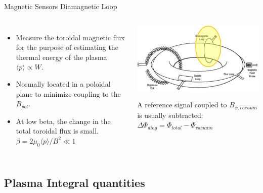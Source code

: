 \documentclass{beamer}
\begin{document}
\begin{frame}{Magnetic Sensors } {Diamagnetic Loop}
\begin{columns}
     \begin{itemize}
	 \item Measure the toroidal magnetic flux for the purpose of estimating the thermal energy of the plasma $\langle p \rangle  \propto W$. 
	 \item Normally located in a poloidal plane  to minimize coupling to the $B_{pol}$.
	\item At low beta, the change in the total toroidal flux is small. 
	$\beta = 2 \mu_0 \langle p \rangle  /B^2 \ll 1$ 
     \end{itemize}
	\begin{center}
	\includegraphics[width=1.0\columnwidth]{diamag.png}
	 \begin{block}{} 
		 A reference signal coupled to $B_{\phi, vacuum}$ is usually subtracted:
		$ \Delta \Phi_{diag} =  \Phi_{total}  -   \Phi_{vacuum}$ %
	\end{block} 
	\end{center}

\end{columns}	
\end{frame}

\subsection{Plasma Integral  quantities }
\end{document}
